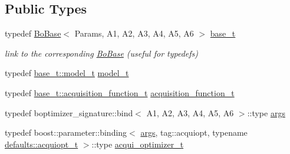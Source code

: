 \subsection*{Public Types}
\begin{DoxyCompactItemize}
\item 
typedef \hyperlink{classlimbo_1_1bayes__opt_1_1_bo_base}{Bo\+Base}$<$ Params, A1, A2, A3, A4, A5, A6 $>$ \hyperlink{classlimbo_1_1bayes__opt_1_1_b_optimizer_acfc58fcdd57f2f5520e6ba175677c319}{base\+\_\+t}
\begin{DoxyCompactList}\small\item\em link to the corresponding \hyperlink{classlimbo_1_1bayes__opt_1_1_bo_base}{Bo\+Base} (useful for typedefs) \end{DoxyCompactList}\item 
typedef \hyperlink{classlimbo_1_1bayes__opt_1_1_bo_base_a151af5c7eef92a82d8813bb2e067d267}{base\+\_\+t\+::model\+\_\+t} \hyperlink{classlimbo_1_1bayes__opt_1_1_b_optimizer_aaddb85f5014ba377c9e2e3a64db87678}{model\+\_\+t}
\item 
typedef \hyperlink{classlimbo_1_1bayes__opt_1_1_bo_base_a200a43abb6c95d2d99660898b36f2200}{base\+\_\+t\+::acquisition\+\_\+function\+\_\+t} \hyperlink{classlimbo_1_1bayes__opt_1_1_b_optimizer_ae0a407a5eba370a6a30acda501cd4ddc}{acquisition\+\_\+function\+\_\+t}
\item 
typedef boptimizer\+\_\+signature\+::bind$<$ A1, A2, A3, A4, A5, A6 $>$\+::type \hyperlink{classlimbo_1_1bayes__opt_1_1_b_optimizer_afd4c6a7d361de59fac5aa3a332ea0149}{args}
\item 
typedef boost\+::parameter\+::binding$<$ \hyperlink{classlimbo_1_1bayes__opt_1_1_bo_base_a3844c259aa1e59d0241f90390aa6f7fa}{args}, tag\+::acquiopt, typename \hyperlink{structlimbo_1_1bayes__opt_1_1_b_optimizer_1_1defaults_af714505103b93f5a2028030a192cc955}{defaults\+::acquiopt\+\_\+t} $>$\+::type \hyperlink{classlimbo_1_1bayes__opt_1_1_b_optimizer_a18dc1b593c859b8f89450a31f80fb592}{acqui\+\_\+optimizer\+\_\+t}
\end{DoxyCompactItemize}
